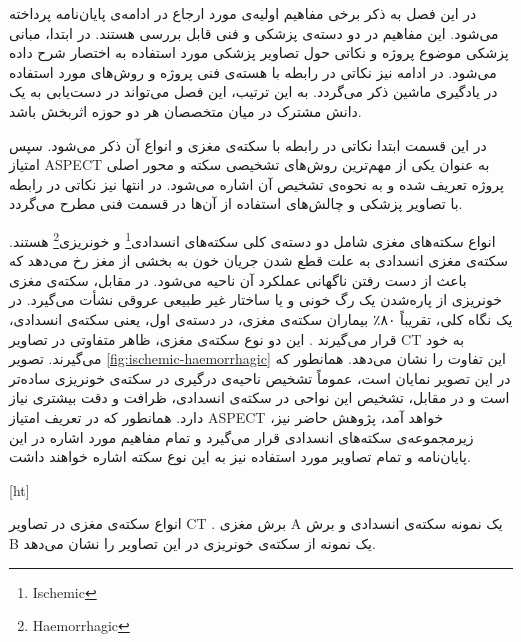 

در این فصل به ذکر برخی مفاهیم اولیه‌ی مورد ارجاع در ادامه‌ی پایان‌نامه پرداخته می‌شود.
این مفاهیم در دو دسته‌ی پزشکی و فنی قابل بررسی هستند.
در ابتدا، مبانی پزشکی موضوع پروژه و نکاتی حول تصاویر پزشکی مورد استفاده به اختصار شرح داده می‌شود.
در ادامه نیز نکاتی در رابطه با هسته‌ی فنی پروژه و روش‌های مورد استفاده در یادگیری ماشین ذکر می‌گردد.
به این ترتیب، این فصل می‌تواند در دست‌یابی به یک دانش مشترک در میان متخصصان هر دو حوزه اثربخش باشد.


در این قسمت ابتدا نکاتی در رابطه با سکته‌ی مغزی و انواع آن ذکر می‌شود.
سپس امتیاز ASPECT به عنوان یکی از مهم‌ترین روش‌های تشخیصی سکته و محور اصلی پروژه تعریف شده و
به نحوه‌ی تشخیص آن اشاره می‌شود.
در انتها نیز نکاتی در رابطه با تصاویر پزشکی و چالش‌های استفاده از آن‌ها در قسمت فنی مطرح می‌گردد.


انواع سکته‌های مغزی شامل دو دسته‌ی کلی سکته‌های 
انسدادی\footnote{Ischemic}
و 
خونریزی\footnote{Haemorrhagic} 
هستند.
سکته‌ی مغزی انسدادی به علت قطع شدن جریان خون به بخشی از مغز رخ می‌دهد که باعث از دست رفتن ناگهانی عملکرد آن ناحیه می‌شود.
در مقابل، سکته‌ی مغزی خونریزی از پاره‌شدن یک رگ خونی و یا ساختار غیر طبیعی عروقی نشأت می‌گیرد.
در یک نگاه کلی، تقریباً ۸۰٪ بیماران سکته‌ی مغزی، در دسته‌ی اول، یعنی سکته‌ی انسدادی، قرار می‌گیرند \cite{donkor2018stroke}.
این دو نوع سکته‌ی مغزی، ظاهر متفاوتی در تصاویر CT به خود می‌گیرند.
تصویر 
\ref{fig:ischemic-haemorrhagic}
 این تفاوت را نشان می‌دهد.
همانطور که در این تصویر نمایان است، عموماً تشخیص ناحیه‌ی درگیری
در سکته‌ی خونریزی ساده‌تر است و در مقابل، تشخیص این نواحی در سکته‌ی انسدادی، ظرافت و دقت بیشتری نیاز دارد.
همانطور که در تعریف امتیاز ASPECT خواهد آمد، پژوهش حاضر نیز، زیرمجموعه‌ی 
سکته‌های انسدادی قرار می‌گیرد و تمام مفاهیم مورد اشاره در این پایان‌نامه و تمام تصاویر مورد استفاده نیز به این نوع سکته اشاره خواهند داشت.


[ht]
\caption[انواع سکته‌ی مغزی]{انواع سکته‌ی مغزی در تصاویر CT \cite{le2018ischemic}. برش مغزی A یک نمونه سکته‌ی انسدادی و برش B یک نمونه از سکته‌ی خونریزی در این تصاویر را نشان می‌دهد.}

